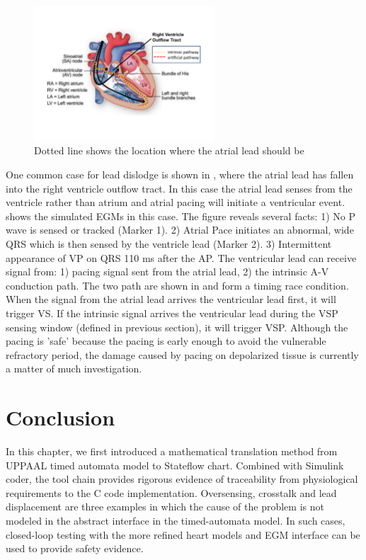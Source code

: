  \begin{figure}
\center
\includegraphics[width=0.60\textwidth]{figs/race_cond.pdf}
\caption{Dotted line shows the location where the atrial lead should be}
\label{fig:race_cond}
\end{figure}

One common case for lead dislodge is shown in , where the atrial lead has fallen into the right ventricle outflow tract. In this case the atrial lead senses from the ventricle rather than atrium and atrial pacing will initiate a ventricular event.  shows the simulated EGMs in this case. The figure reveals several facts: 1) No P wave is sensed or tracked (Marker 1). 2) Atrial Pace initiates an abnormal, wide QRS which is then sensed by the ventricle lead (Marker 2). 3) Intermittent appearance of VP on QRS 110 ms after the AP. The ventricular lead can receive signal from: 1) pacing signal sent from the atrial lead, 2) the intrinsic A-V conduction path. The two path are shown in  and form a timing race condition. When the signal from the atrial lead arrives the ventricular lead first, it will trigger VS. If the intrinsic signal arrives the ventricular lead during the VSP sensing window (defined in previous section), it will trigger VSP. Although the pacing is 'safe' because the pacing is early enough to avoid the vulnerable refractory period, the damage caused by pacing on depolarized tissue is currently a matter of much investigation. 
\section{Conclusion}
In this chapter, we first introduced a mathematical translation method from UPPAAL timed automata model to Stateflow chart. Combined with Simulink coder, the tool chain provides rigorous evidence of traceability from physiological requirements to the C code implementation. Oversensing, crosstalk and lead displacement are three examples in which the cause of the problem is not modeled in the abstract interface in the timed-automata model. In such cases, closed-loop testing with the more refined heart models and EGM interface can be used to provide safety evidence.

